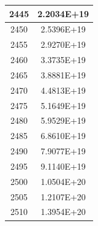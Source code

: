 \documentclass[a4paper]{article}
\begin{document}
\begin{tabular}{|c|c|}
		\hline
		2445 & 2.2034E+19 \\
		\hline
		2450 & 2.5396E+19 \\
		\hline
		2455 & 2.9270E+19 \\
		\hline
		2460 & 3.3735E+19 \\
		\hline
		2465 & 3.8881E+19 \\
		\hline
		2470 & 4.4813E+19 \\
		\hline
		2475 & 5.1649E+19 \\
		\hline
		2480 & 5.9529E+19 \\
		\hline
		2485 & 6.8610E+19 \\
		\hline
		2490 & 7.9077E+19 \\
		\hline
		2495 & 9.1140E+19 \\
		\hline
		2500 & 1.0504E+20 \\
		\hline
		2505 & 1.2107E+20 \\
		\hline
		2510 & 1.3954E+20 \\
		\hline
	\end{tabular}
	\hfill
\end{document}
